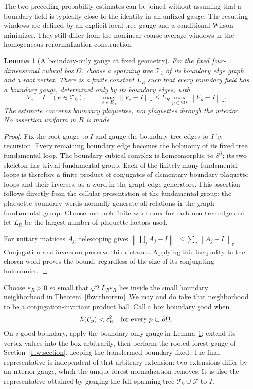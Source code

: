 \documentclass[11pt]{article}
\newcommand{\norm}[1]{\left\lVert#1\right\rVert}
\newtheorem{lemma}[theorem]{Lemma}
\theoremstyle{remark}
\begin{document}
The two preceding probability estimates can be joined without
assuming that a boundary field is typically close to the identity
in an unfixed gauge. The resulting windows are defined by an
explicit local tree gauge and a conditional Wilson minimizer.
They still differ from the nonlinear coarse-average windows in
the homogeneous renormalization construction.

\begin{lemma}[A boundary-only gauge at fixed geometry]
\label{fbb:boundarygauge}
For the fixed four-dimensional cubical box \(\Omega\), choose a
spanning tree \(\mathcal T_\partial\) of its boundary edge graph
and a root vertex. There is a finite constant \(L_R\) such that
every boundary field has a boundary gauge, determined only by its
boundary edges, with
\[
 V_e=I\quad(e\in\mathcal T_\partial),\qquad
 \max_{e\in E_\partial}\norm{V_e-I}_\tau
 \leq L_R\max_{p\subset\partial\Omega}\norm{U_p-I}_\tau.
\]
The estimate concerns boundary plaquettes, not plaquettes through
the interior. No assertion uniform in \(R\) is made.
\end{lemma}
\begin{proof}
Fix the root gauge to \(I\) and gauge the boundary tree edges to \(I\)
by recursion. Every remaining boundary edge becomes the holonomy
of its fixed tree fundamental loop. The boundary cubical complex is
homeomorphic to \(S^3\); its two-skeleton has trivial fundamental
group. Each of the finitely many fundamental loops is therefore a
finite product of conjugates of elementary boundary plaquette
loops and their inverses, as a word in the graph edge generators.
This assertion follows directly from the cellular presentation of
the fundamental group: the plaquette boundary words normally
generate all relations in the graph fundamental group. Choose one
such finite word once for each non-tree edge and let \(L_R\) be the
largest number of plaquette factors used.

For unitary matrices \(A_j\), telescoping gives
\(\norm{\prod_j A_j-I}_\tau\leq\sum_j\norm{A_j-I}_\tau\).
Conjugation and inversion preserve this distance. Applying this
inequality to the chosen word proves the bound, regardless of
the size of its conjugating holonomies.
\end{proof}

Choose \(\varepsilon_R>0\) so small that
\(\sqrt2 L_R\varepsilon_R\) lies inside the small boundary
neighborhood in Theorem~\ref{fbw:theorem}. We may and do take that
neighborhood to be a conjugation-invariant product ball. Call a
box boundary good when
\[
 h(U_p)<\varepsilon_R^2\quad\hbox{for every }p\subset\partial\Omega.
\]
On a good boundary, apply the boundary-only gauge in
Lemma~\ref{fbb:boundarygauge}; extend its vertex values into the
box arbitrarily, then perform the rooted forest gauge of
Section~\ref{fbw:section}, keeping the transformed boundary fixed.
The final representative is independent of that arbitrary extension:
two extensions differ by an interior gauge, which the unique forest
normalization removes. It is also the representative obtained by
gauging the full spanning tree
\(\mathcal T_\partial\cup\mathcal F\) to \(I\).
\end{document}
